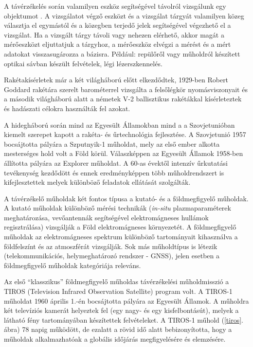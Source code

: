 \documentclass[12pt]{report}
\numberwithin{equation}{section}
\numberwithin{table}{section}
\numberwithin{figure}{section}
\begin{document}
A távérzékelés során valamilyen eszköz segítségével távolról vizsgálunk egy objektumot \cite{RemoteSensing}. A vizsgálatot végző eszközt és a vizsgálat tárgyát valamilyen közeg választja el egymástól és a közegben terjedő jelek segítségével végezhető el a vizsgálat. Ha a vizsgált tárgy távoli vagy nehezen elérhető, akkor magát a mérőeszközt eljuttatjuk a tárgyhoz, a mérőeszköz elvégzi a mérést és a mért adatokat visszasugározza a bázisra. Például: repülőről vagy műholdról készített optikai sávban készült felvételek, légi lézerszkennelés.

Rakétakísérletek már a két világháború előtt elkezdődtek, 1929-ben Robert Goddard rakétára szerelt barométerrel vizsgálta a felsőlégkör nyomásviszonyait és a második világháború alatt a németek V-2 ballisztikus rakétákkal kísérleteztek és hadászati célokra használták fel azokat.

A hidegháború során mind az Egyesült Államokban mind a a Szovjetunióban kiemelt szerepet kapott a rakéta- és űrtechnológia fejlesztése. A Szovjetunió 1957 bocsájtotta pályára a Szputnyik-1 műholdat, mely az első ember alkotta mesterséges hold volt a Föld körül. Válaszképpen az Egyesült Államok 1958-ben állította pályára az Explorer műholdat. A 60-as évektől intenzív űrkutatási tevékenység kezdődött és ennek eredményképpen több műholdrendszert is kifejlesztettek melyek különböző feladatok ellátását szolgálták.

A távérzékelő műholdak két fontos típusa a kutató- és a földmegfigyelő műholdak. A kutató műholdak különböző mérési technikák (\textit{in-situ} plazmaparaméterek meghatározása, vevőantennák segítségével elektromágneses hullámok regisztrálása) vizsgálják a Föld elektromágneses környezetét. A földmegfigyelő műholdak az elektromágneses spektrum különböző tartományait kihasználva a földfelszínt és az atmoszférát vizsgálják. Sok más műholdtípus is létezik (telekommunikációs, helymeghatározó rendszer - GNSS), jelen esetben a földmegfigyelő műholdak kategóriája releváns.

Az első ``klasszikus'' földmegfigyelő műholdas távérzékelési műholdmisszió a TIROS (Television Infrared Observation Satellite) program volt. A TIROS-1 műholdat \cite{tiros11, tiros12} 1960 április 1.-én bocsájtotta pályára az Egyesült Államok. A műholdra két televíziós kamerát helyeztek fel (egy nagy- és egy kisfelbontásút), melyek a látható fény tartományában készítettek felvételeket. A TIROS-1 műhold (\ref{tiros}. ábra) 78 napig működött, de ezalatt a rövid idő alatt bebizonyította, hogy a műholdak alkalmazhatóak a globális időjárás megfigyelésére és elemzésére.
\end{document}
